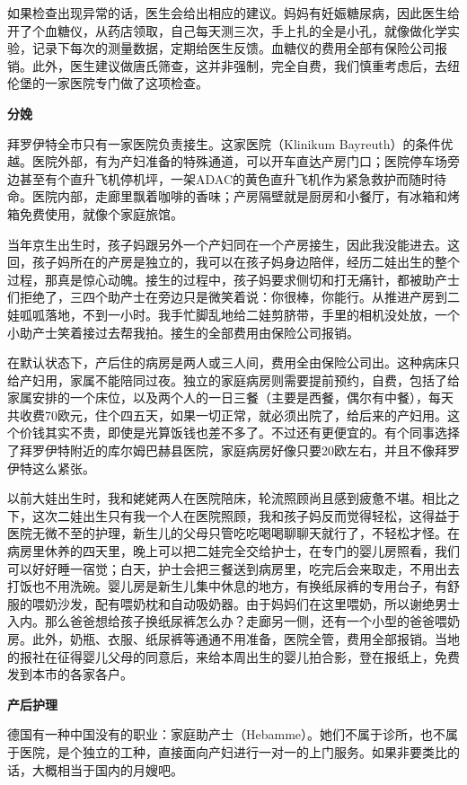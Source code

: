 \documentclass[twoside,openright,headings=optiontohead]{ctexbook} %
\begin{document}
{如果检查出现异常的话，医生会给出相应的建议。妈妈有妊娠糖尿病，因此医生给开了个血糖仪，从药店领取，自己每天测三次，手上扎的全是小孔，就像做化学实验，记录下每次的测量数据，定期给医生反馈。血糖仪的费用全部有保险公司报销。此外，医生建议做唐氏筛查，这并非强制，完全自费，我们慎重考虑后，去纽伦堡的一家医院专门做了这项检查。

\textbf{分娩}

拜罗伊特全市只有一家医院负责接生。这家医院（Klinikum
Bayreuth）的条件优越。医院外部，有为产妇准备的特殊通道，可以开车直达产房门口；医院停车场旁边甚至有个直升飞机停机坪，一架ADAC的黄色直升飞机作为紧急救护而随时待命。医院内部，走廊里飘着咖啡的香味；产房隔壁就是厨房和小餐厅，有冰箱和烤箱免费使用，就像个家庭旅馆。

当年京生出生时，孩子妈跟另外一个产妇同在一个产房接生，因此我没能进去。这回，孩子妈所在的产房是独立的，我可以在孩子妈身边陪伴，经历二娃出生的整个过程，那真是惊心动魄。接生的过程中，孩子妈要求侧切和打无痛针，都被助产士们拒绝了，三四个助产士在旁边只是微笑着说：你很棒，你能行。从推进产房到二娃呱呱落地，不到一小时。我手忙脚乱地给二娃剪脐带，手里的相机没处放，一个小助产士笑着接过去帮我拍。接生的全部费用由保险公司报销。

在默认状态下，产后住的病房是两人或三人间，费用全由保险公司出。这种病床只给产妇用，家属不能陪同过夜。独立的家庭病房则需要提前预约，自费，包括了给家属安排的一个床位，以及两个人的一日三餐（主要是西餐，偶尔有中餐），每天共收费70欧元，住个四五天，如果一切正常，就必须出院了，给后来的产妇用。这个价钱其实不贵，即使是光算饭钱也差不多了。不过还有更便宜的。有个同事选择了拜罗伊特附近的库尔姆巴赫县医院，家庭病房好像只要20欧左右，并且不像拜罗伊特这么紧张。

以前大娃出生时，我和姥姥两人在医院陪床，轮流照顾尚且感到疲惫不堪。相比之下，这次二娃出生只有我一个人在医院照顾，我和孩子妈反而觉得轻松，这得益于医院无微不至的护理，新生儿的父母只管吃吃喝喝聊聊天就行了，不轻松才怪。在病房里休养的四天里，晚上可以把二娃完全交给护士，在专门的婴儿房照看，我们可以好好睡一宿觉；白天，护士会把三餐送到病房里，吃完后会来取走，不用出去打饭也不用洗碗。婴儿房是新生儿集中休息的地方，有换纸尿裤的专用台子，有舒服的喂奶沙发，配有喂奶枕和自动吸奶器。由于妈妈们在这里喂奶，所以谢绝男士入内。那么爸爸想给孩子换纸尿裤怎么办？走廊另一侧，还有一个小型的爸爸喂奶房。此外，奶瓶、衣服、纸尿裤等通通不用准备，医院全管，费用全部报销。当地的报社在征得婴儿父母的同意后，来给本周出生的婴儿拍合影，登在报纸上，免费发到本市的各家各户。

\textbf{产后护理}

德国有一种中国没有的职业：家庭助产士（Hebamme）。她们不属于诊所，也不属于医院，是个独立的工种，直接面向产妇进行一对一的上门服务。如果非要类比的话，大概相当于国内的月嫂吧。

}
\end{document}
